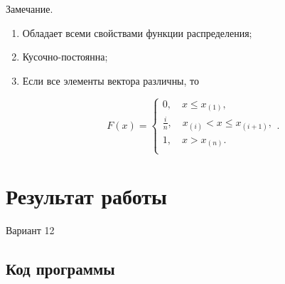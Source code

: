 \documentclass[12pt]{report}
\begin{document}
Замечание.
\begin{enumerate}
    \item  Обладает всеми свойствами функции распределения;
    \item  Кусочно-постоянна;
    \item Если все элементы вектора различны, то

    \begin{equation}
    F(x) =
    \begin{cases}
    0, \quad x \leq x_{(1)}, \\
        \displaystyle\frac{i}{n}, \quad x_{(i)} < x \leq  x_{(i+1)},\\
        1, \quad  x > x_{(n)}. \\
    \end{cases}.
\end{equation}
\end{enumerate}

\section{Результат работы}

Вариант 12

\subsection{Код программы}
\end{document}
